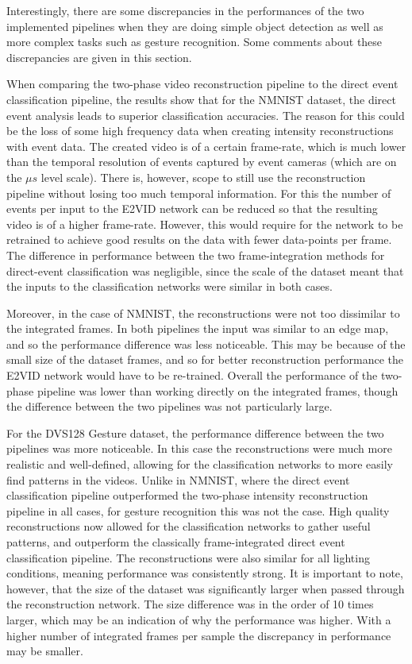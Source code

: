 Interestingly, there are some discrepancies in the performances of the two implemented pipelines when they are doing simple object detection as well as more complex tasks such as gesture recognition. Some comments about these discrepancies are given in this section.

When comparing the two-phase video reconstruction pipeline to the direct event classification pipeline, the results show that for the NMNIST dataset, the direct event analysis leads to superior classification accuracies. The reason for this could be the loss of some high frequency data when creating intensity reconstructions with event data. The created video is of a certain frame-rate, which is much lower than the temporal resolution of events captured by event cameras (which are on the $ \mu s $ level scale). There is, however, scope to still use the reconstruction pipeline without losing too much temporal information. For this the number of events per input to the E2VID network can be reduced so that the resulting video is of a higher frame-rate. However, this would require for the network to be retrained to achieve good results on the data with fewer data-points per frame. The difference in performance between the two frame-integration methods for direct-event classification was negligible, since the scale of the dataset meant that the inputs to the classification networks were similar in both cases.

Moreover, in the case of NMNIST, the reconstructions were not too dissimilar to the integrated frames. In both pipelines the input was similar to an edge map, and so the performance difference was less noticeable. This may be because of the small size of the dataset frames, and so for better reconstruction performance the E2VID network would have to be re-trained. Overall the performance of the two-phase pipeline was lower than working directly on the integrated frames, though the difference between the two pipelines was not particularly large.

For the DVS128 Gesture dataset, the performance difference between the two pipelines was more noticeable. In this case the reconstructions were much more realistic and well-defined, allowing for the classification networks to more easily find patterns in the videos. Unlike in NMNIST, where the direct event classification pipeline outperformed the two-phase intensity reconstruction pipeline in all cases, for gesture recognition this was not the case. High quality reconstructions now allowed for the classification networks to gather useful patterns, and outperform the classically frame-integrated direct event classification pipeline. The reconstructions were also similar for all lighting conditions, meaning performance was consistently strong. It is important to note, however, that the size of the dataset was significantly larger when passed through the reconstruction network. The size difference was in the order of 10 times larger, which may be an indication of why the performance was higher. With a higher number of integrated frames per sample the discrepancy in performance may be smaller.

